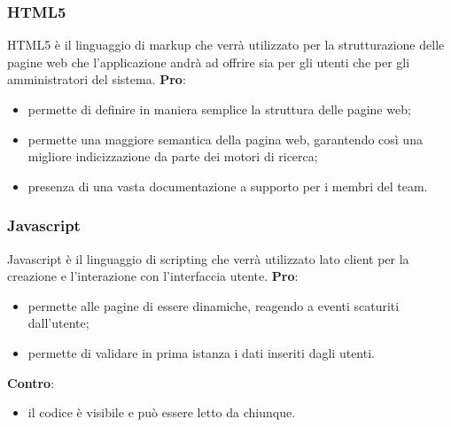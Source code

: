 
		\subsubsection{HTML5} %
		\label{ssub:html}
		HTML5 è il linguaggio di markup che verrà utilizzato per la strutturazione delle pagine web che l'applicazione andrà ad offrire sia per gli utenti che per gli amministratori del sistema. \newline
		\textbf{Pro}:
			\begin{itemize}
				\item permette di definire in maniera semplice la struttura delle pagine web;
				\item permette una maggiore semantica della pagina web, garantendo così una migliore indicizzazione da parte dei motori di ricerca;
				\item presenza di una vasta documentazione a supporto per i membri del team.
			\end{itemize}
			\noindent

		\subsubsection{Javascript} %
		\label{ssub:javascript}
		Javascript è il linguaggio di scripting che verrà utilizzato lato client per la creazione e l'interazione con l'interfaccia utente. \newline
		\textbf{Pro}:
			\begin{itemize}
				\item permette alle pagine di essere dinamiche, reagendo a eventi scaturiti dall'utente;
				\item permette di validare in prima istanza i dati inseriti dagli utenti.
			\end{itemize}
		\noindent
		\newline
		\textbf{Contro}:
			\begin{itemize}
				\item il codice è visibile e può essere letto da chiunque.
			\end{itemize}
			\noindent

